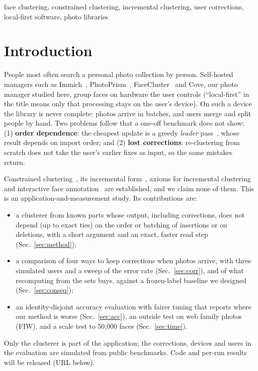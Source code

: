 \documentclass[conference]{IEEEtran}
\begin{document}
\begin{IEEEkeywords}
face clustering, constrained clustering, incremental clustering, user corrections, local-first software, photo libraries
\end{IEEEkeywords}

\section{Introduction}
People most often search a personal photo collection by person. Self-hosted managers such as
Immich~\cite{immich}, PhotoPrism~\cite{photoprism}, FaceCluster~\cite{filonenko2025facecluster} and Cove, our photo manager
studied here, group faces on hardware the user controls (``local-first'' in the title means only that processing stays on the user's device). On such a device the library is never complete: photos arrive in
batches, and users merge and split people by hand. Two problems follow that a one-off benchmark does not show:
(1) \textbf{order dependence}: the cheapest update is a greedy \emph{leader} pass~\cite{hartigan1975clustering}, whose
result depends on import order; and (2) \textbf{lost corrections}: re-clustering from scratch does not take the user's
earlier fixes as input, so the same mistakes return.

Constrained clustering~\cite{wagstaff2001copkmeans,davidson2005agglomerative}, its incremental
form~\cite{davidson2007incremental}, axioms for incremental clustering~\cite{bandyopadhyay2016axioms} and
interactive face annotation~\cite{tian2007face} are established, and we claim none of them. This is an
application-and-measurement study. Its contributions are:
\begin{itemize}
\item a clusterer from known parts whose output, including corrections, does not depend (up to exact ties) on the order or batching of
insertions or on deletions, with a short argument and an exact, faster read step (Sec.~\ref{sec:method});
\item a comparison of four ways to keep corrections when photos arrive, with three simulated users and a sweep of the
error rate (Sec.~\ref{sec:corr}), and of what recomputing from the sets buys, against a frozen-label baseline we designed
(Sec.~\ref{sec:conseq});
\item an identity-disjoint accuracy evaluation with fairer tuning that reports where our method is worse (Sec.~\ref{sec:acc}),
an outside test on web family photos (FIW), and a scale test to 50{,}000 faces (Sec.~\ref{sec:time}).
\end{itemize}
Only the clusterer is part of the application; the corrections, devices and users in the evaluation are simulated from public
benchmarks. Code and per-run results will be released (URL below).
\end{document}
